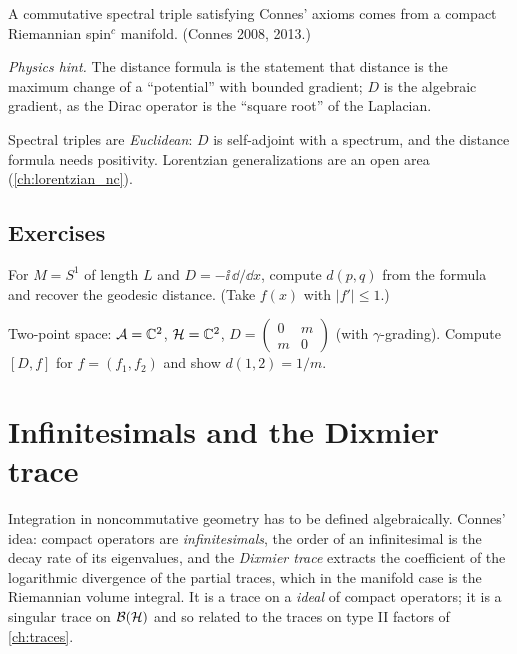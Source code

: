 \mshift{6mm}
\begin{theorem}
A commutative spectral triple satisfying Connes' axioms comes from a compact Riemannian spin$^c$ manifold. (Connes 2008, 2013.)
\end{theorem}

\emph{Physics hint.} The distance formula is the statement that distance is the maximum change of a ``potential'' with bounded gradient; $D$ is the algebraic gradient, as the Dirac operator is the ``square root'' of the Laplacian.

\begin{whatwrong}
Spectral triples are \emph{Euclidean}: $D$ is self-adjoint with a spectrum, and the distance formula needs positivity. Lorentzian generalizations are an open area (\cref{ch:lorentzian_nc}).
\end{whatwrong}

\subsection*{Exercises}
\begin{exercise}\label{ex:spectral_triples:1}
For $M=S^1$ of length $L$ and $D=-\ii\,\dd/\dd x$, compute $d(p,q)$ from the formula and recover the geodesic distance. (Take $f(x)$ with $|f'|\le1$.)
\end{exercise}
\begin{exercise}\label{ex:spectral_triples:2}
Two-point space: $\mathcal{A}=\mathbb{C}^2$, $\mathcal{H}=\mathbb{C}^2$, $D=\begin{pmatrix}0&m\\m&0\end{pmatrix}$ (with $\gamma$-grading). Compute $[D,f]$ for $f=(f_1,f_2)$ and show $d(1,2)=1/m$.
\end{exercise}

\section{Infinitesimals and the Dixmier trace}\label{ch:dixmier}
\skippable

\begin{physmotiv}
Integration in noncommutative geometry has to be defined algebraically. Connes' idea: compact operators are \emph{infinitesimals}, the order of an infinitesimal is the decay rate of its eigenvalues, and the \emph{Dixmier trace} extracts the coefficient of the logarithmic divergence of the partial traces, which in the manifold case is the Riemannian volume integral. It is a trace on a \emph{ideal} of compact operators; it is a singular trace on $\mathcal{B}(\mathcal{H})$ and so related to the traces on type II factors of \cref{ch:traces}.
\end{physmotiv}

